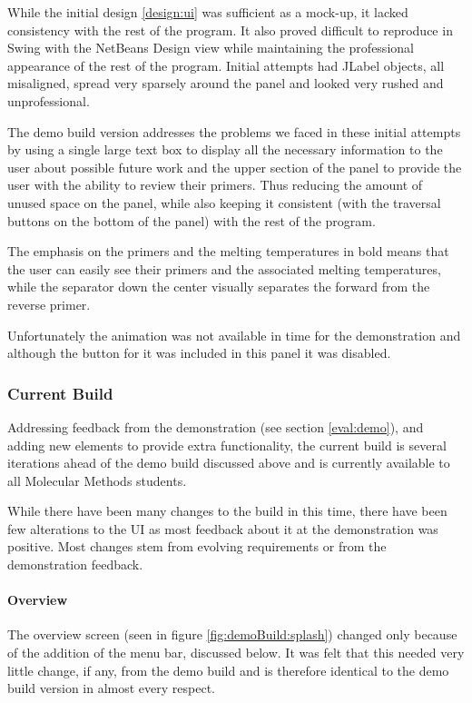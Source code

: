 While the initial design \ref{design:ui} was sufficient as a mock-up,
it lacked consistency with the rest of the program.
It also proved difficult to reproduce in Swing with the NetBeans
Design view while maintaining the professional appearance of the rest
of the program.
Initial attempts had JLabel objects, all misaligned, spread very
sparsely around the panel and looked very rushed and unprofessional.

The demo build version addresses the problems we faced in these initial
attempts by using a single large text box to display all the necessary
information to the user about possible future work and the upper
section of the panel to provide the user with the ability to review
their primers. 
Thus reducing the amount of unused space on the panel,
while also keeping it consistent (with the traversal buttons on the
bottom of the panel) with the rest of the program.

The emphasis on the primers and the melting temperatures in bold means
that the user can easily see their primers and the associated melting
temperatures, while the separator down the center visually separates
the forward from the reverse primer.

Unfortunately the animation was not available in time for the
demonstration and although the button for it was included in this
panel it was disabled.


\subsubsection{Current Build}

Addressing feedback from the demonstration (see section \ref{eval:demo}),
and adding new elements to provide extra functionality, the current
build is several iterations ahead of the demo build discussed above
and is currently available to all Molecular Methods students.

While there have been many changes to the build in this time, there
have been few alterations to the UI as most feedback about it at the
demonstration was positive.
Most changes stem from evolving requirements or from the
demonstration feedback.

\paragraph{Overview}
The overview screen (seen in figure \ref{fig:demoBuild:splash})
changed only because of the addition of the menu bar, discussed
below.
It was felt that this needed very little change, if any, from the demo
build and is therefore identical to the demo build version in almost
every respect.

